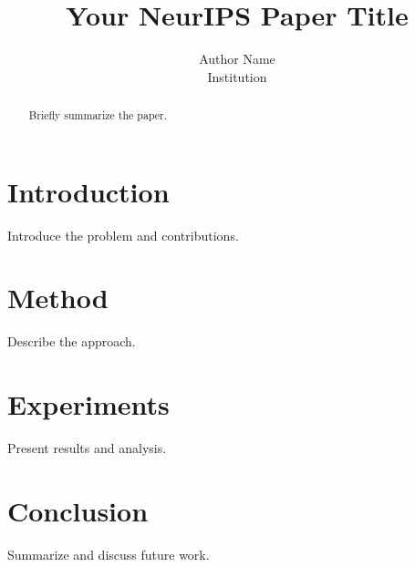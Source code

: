 \documentclass[11pt]{article}
\title{Your NeurIPS Paper Title}
\author{Author Name \\ Institution}
\begin{document}
\maketitle

\begin{abstract}
Briefly summarize the paper.
\end{abstract}

\section{Introduction}
Introduce the problem and contributions.

\section{Method}
Describe the approach.

\section{Experiments}
Present results and analysis.

\section{Conclusion}
Summarize and discuss future work.



\end{document}
